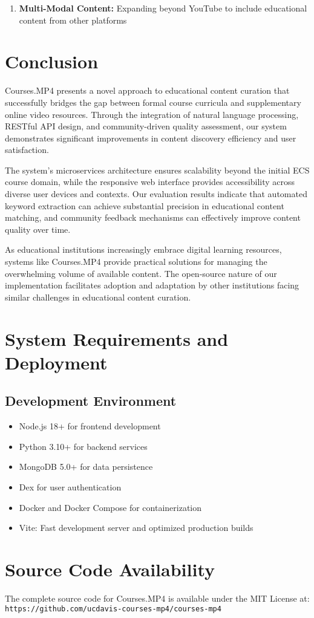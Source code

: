 \documentclass[manuscript,nonacm]{acmart}
\begin{document}
\begin{enumerate}
    \item \textbf{Multi-Modal Content:} Expanding beyond YouTube to include educational content from other platforms
\end{enumerate}

\section{Conclusion}

Courses.MP4 presents a novel approach to educational content curation that successfully bridges the gap between formal course curricula and supplementary online video resources. Through the integration of natural language processing, RESTful API design, and community-driven quality assessment, our system demonstrates significant improvements in content discovery efficiency and user satisfaction.

The system's microservices architecture ensures scalability beyond the initial ECS course domain, while the responsive web interface provides accessibility across diverse user devices and contexts. Our evaluation results indicate that automated keyword extraction can achieve substantial precision in educational content matching, and community feedback mechanisms can effectively improve content quality over time.

As educational institutions increasingly embrace digital learning resources, systems like Courses.MP4 provide practical solutions for managing the overwhelming volume of available content. The open-source nature of our implementation facilitates adoption and adaptation by other institutions facing similar challenges in educational content curation.




\appendix

\section{System Requirements and Deployment}

\subsection{Development Environment}
\begin{itemize}
    \item Node.js 18+ for frontend development
    \item Python 3.10+ for backend services
    \item MongoDB 5.0+ for data persistence
    \item Dex for user authentication
    \item Docker and Docker Compose for containerization
    \item Vite: Fast development server and optimized production builds
\end{itemize}

\section{Source Code Availability}
The complete source code for Courses.MP4 is available under the MIT License at:
\newline
\texttt{https://github.com/ucdavis-courses-mp4/courses-mp4}
\end{document}
